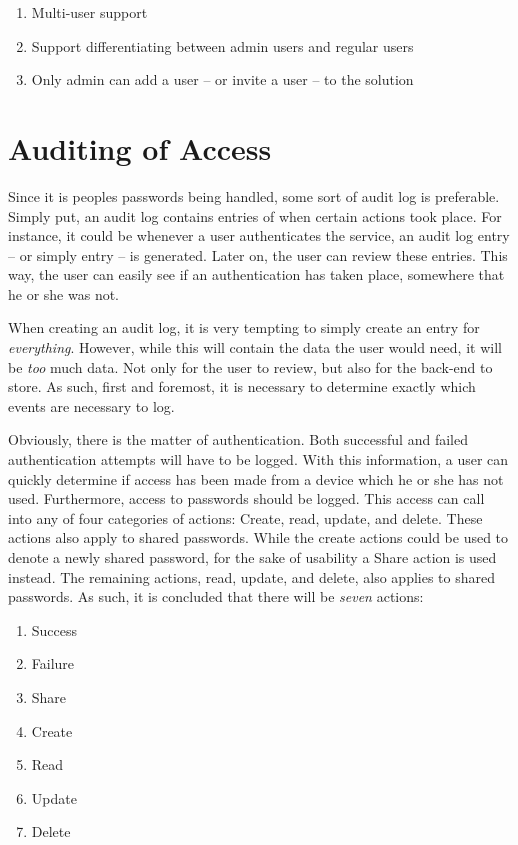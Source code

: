 			\vspace{-3ex}\begin{enumerate}
				\setlength\itemsep{0.1em}
				\setcounter{enumi}{2-1}
				\item Multi-user support
				\item Support differentiating between admin users and regular users
				\setcounter{enumi}{6-1}
				\item Only admin can add a user -- or invite a user -- to the solution
			\end{enumerate}

	\section{Auditing of Access}
		\label{sec:audit}
		Since it is peoples passwords being handled, some sort of audit log is preferable. Simply put, an audit log contains entries of when certain actions took place. For instance, it could be whenever a user authenticates the service, an audit log entry -- or simply entry -- is generated. Later on, the user can review these entries. This way, the user can easily see if an authentication has taken place, somewhere that he or she was not.

		When creating an audit log, it is very tempting to simply create an entry for \emph{everything}. However, while this will contain the data the user would need, it will be \emph{too} much data. Not only for the user to review, but also for the back-end to store. As such, first and foremost, it is necessary to determine exactly which events are necessary to log.

		Obviously, there is the matter of authentication. Both successful and failed authentication attempts will have to be logged. With this information, a user can quickly determine if access has been made from a device which he or she has not used. Furthermore, access to passwords should be logged. This access can call into any of four categories of actions: Create, read, update, and delete. These actions also apply to shared passwords. While the create actions could be used to denote a newly shared password, for the sake of usability a Share action is used instead. The remaining actions, read, update, and delete, also applies to shared passwords. As such, it is concluded that there will be \emph{seven} actions:
		\begin{enumerate}
			\item Success
			\item Failure
			\item Share
			\item Create
			\item Read
			\item Update
			\item Delete
		\end{enumerate}

